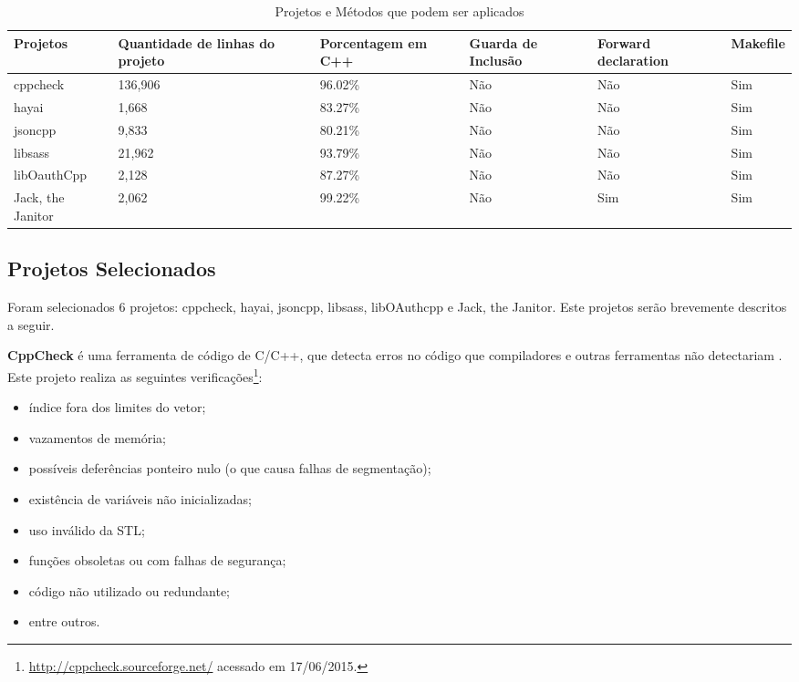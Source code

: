 \begin{table}[!ht]
\centering
\caption{Projetos e Métodos que podem ser aplicados}
\label{tab:projects}
\begin{tiny}
\begin{tabular}{lp{2cm}p{2cm}p{2cm}p{2cm}p{2cm}}
	\toprule
	\textbf{Projetos} & \textbf{Quantidade de linhas do projeto} & \textbf{Porcentagem em C++} &
	\textbf{Guarda de Inclusão} & \textbf{Forward declaration} & \textbf{Makefile} \\
	\midrule
	cppcheck & 136,906 & 96.02\% & Não & Não & Sim \\
	hayai & 1,668 & 83.27\% & Não & Não & Sim \\
	jsoncpp & 9,833 & 80.21\% & Não & Não & Sim \\
	libsass & 21,962 & 93.79\% & Não & Não & Sim \\
	libOauthCpp & 2,128 & 87.27\% & Não & Não & Sim \\
	Jack, the Janitor & 2,062 & 99.22\% & Não & Sim & Sim \\
	\bottomrule
\end{tabular}
\end{tiny}
\end{table}

\subsection{Projetos Selecionados}

Foram selecionados 6 projetos: cppcheck, hayai, jsoncpp, libsass,
 libOAuthcpp e Jack, the Janitor. Este projetos serão brevemente 
descritos a seguir.

\textbf{CppCheck} é uma ferramenta de código de C/C++, que detecta erros no código
 que compiladores e outras ferramentas não detectariam . Este projeto realiza
 as seguintes verificações\footnote{\url{http://cppcheck.sourceforge.net/}
 acessado em 17/06/2015.}:

\begin{itemize}
	\item índice fora dos limites do vetor;    
    \item vazamentos de memória;
    \item possíveis deferências ponteiro nulo (o que causa falhas de segmentação);
	\item existência de variáveis não inicializadas;
	\item uso inválido da STL;
	\item funções obsoletas ou com falhas de segurança; 
	\item código não utilizado ou redundante;
	\item entre outros.
\end{itemize}



